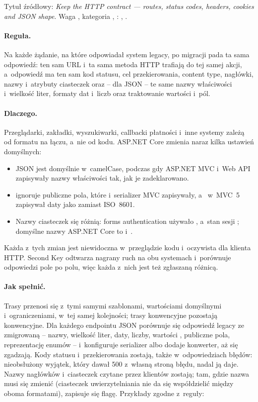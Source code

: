 Tytuł źródłowy: \emph{Keep the HTTP contract --- routes, status codes, headers, cookies and
JSON shape}. Waga , kategoria , :
, .

\paragraph{Reguła.} Na każde żądanie, na które odpowiadał system legacy, po migracji pada ta
sama odpowiedź: ten sam URL i~ta sama metoda HTTP trafiają do tej samej akcji, a~odpowiedź
ma ten sam kod statusu, cel przekierowania, content type, nagłówki, nazwy i~atrybuty
ciasteczek oraz -- dla JSON -- te same nazwy właściwości i~wielkość liter, formaty dat
i~liczb oraz traktowanie wartości  i~pól.

\paragraph{Dlaczego.} Przeglądarki, zakładki, wyszukiwarki, callbacki płatności i~inne
systemy zależą od formatu na łączu, a~nie od kodu. ASP.NET Core zmienia naraz kilka ustawień
domyślnych:
\begin{itemize}
  \item JSON jest domyślnie w~camelCase, podczas gdy  ASP.NET MVC
        i~Web API zapisywały nazwy właściwości tak, jak je zadeklarowano.
  \item {} ignoruje publiczne pola, które 
        i~serializer MVC zapisywały, a~ w~MVC~5 zapisywał daty jako
         zamiast ISO~8601.
  \item Nazwy ciasteczek się różnią: forms authentication używało ,
        a~stan sesji ; domyślne nazwy ASP.NET Core to
         i~.
\end{itemize}
Każda z~tych zmian jest niewidoczna w~przeglądzie kodu i~oczywista dla klienta HTTP. Second
Key odtwarza nagrany ruch na obu systemach i~porównuje odpowiedzi pole po polu, więc każda
z~nich jest też zgłaszaną różnicą.

\paragraph{Jak spełnić.} Trasy przenosi się z~tymi samymi szablonami, wartościami domyślnymi
i~ograniczeniami, w~tej samej kolejności; trasy konwencyjne pozostają konwencyjne. Dla
każdego endpointu JSON porównuje się odpowiedź legacy ze zmigrowaną -- nazwy, wielkość liter,
daty, liczby, wartości , publiczne pola, reprezentację enumów -- i~konfiguruje
serializer albo dodaje konwerter, aż się zgadzają. Kody statusu i~przekierowania zostają,
także w~odpowiedziach błędów: nieobsłużony wyjątek, który dawał 500 z~własną stroną błędu,
nadal ją daje. Nazwy nagłówków i~ciasteczek czytane przez klientów zostają; tam, gdzie nazwa
musi się zmienić (ciasteczek uwierzytelniania nie da się współdzielić między oboma
formatami), zapisuje się flagę. Przykłady zgodne z~reguły:

